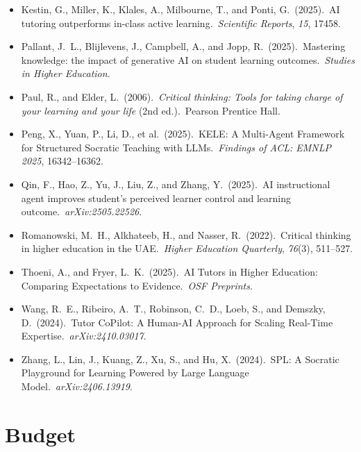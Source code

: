 \documentclass[11pt,a4paper]{article}
\begin{document}
\begin{itemize}[nosep, leftmargin=*, label={}]
    \item Kestin, G., Miller, K., Klales, A., Milbourne, T., and Ponti, G.\ (2025).\ AI tutoring outperforms in-class active learning.\ \textit{Scientific Reports}, \textit{15}, 17458.
    \item Pallant, J.\ L., Blijlevens, J., Campbell, A., and Jopp, R.\ (2025).\ Mastering knowledge: the impact of generative AI on student learning outcomes.\ \textit{Studies in Higher Education}.
    \item Paul, R., and Elder, L.\ (2006).\ \textit{Critical thinking: Tools for taking charge of your learning and your life} (2nd ed.).\ Pearson Prentice Hall.
    \item Peng, X., Yuan, P., Li, D., et al.\ (2025).\ KELE\@: A Multi-Agent Framework for Structured Socratic Teaching with LLMs.\ \textit{Findings of ACL: EMNLP 2025}, 16342--16362.
    \item Qin, F., Hao, Z., Yu, J., Liu, Z., and Zhang, Y.\ (2025).\ AI instructional agent improves student's perceived learner control and learning outcome.\ \textit{arXiv:2505.22526}.
    \item Romanowski, M.\ H., Alkhateeb, H., and Nasser, R.\ (2022).\ Critical thinking in higher education in the UAE.\ \textit{Higher Education Quarterly}, \textit{76}(3), 511--527.
    \item Thoeni, A., and Fryer, L.\ K.\ (2025).\ AI Tutors in Higher Education: Comparing Expectations to Evidence.\ \textit{OSF Preprints}.
    \item Wang, R.\ E., Ribeiro, A.\ T., Robinson, C.\ D., Loeb, S., and Demszky, D.\ (2024).\ Tutor CoPilot: A Human-AI Approach for Scaling Real-Time Expertise.\ \textit{arXiv:2410.03017}.
    \item Zhang, L., Lin, J., Kuang, Z., Xu, S., and Hu, X.\ (2024).\ SPL\@: A Socratic Playground for Learning Powered by Large Language Model.\ \textit{arXiv:2406.13919}.
\end{itemize}

\section{Budget}
\end{document}
